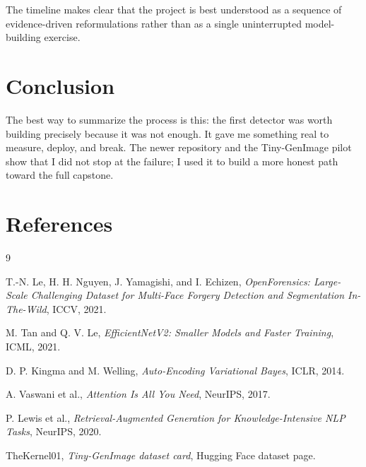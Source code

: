 \documentclass[11pt]{article}
\begin{document}
The timeline makes clear that the project is best understood as a sequence of evidence-driven reformulations rather than as a single uninterrupted model-building exercise.

\section{Conclusion}

The best way to summarize the process is this: the first detector was worth building precisely because it was not enough. It gave me something real to measure, deploy, and break. The newer repository and the Tiny-GenImage pilot show that I did not stop at the failure; I used it to build a more honest path toward the full capstone.


\section*{References}

\begin{thebibliography}{9}

T.-N. Le, H. H. Nguyen, J. Yamagishi, and I. Echizen,
\emph{OpenForensics: Large-Scale Challenging Dataset for Multi-Face Forgery Detection and Segmentation In-The-Wild},
ICCV, 2021.

M. Tan and Q. V. Le,
\emph{EfficientNetV2: Smaller Models and Faster Training},
ICML, 2021.

D. P. Kingma and M. Welling,
\emph{Auto-Encoding Variational Bayes},
ICLR, 2014.

A. Vaswani et al.,
\emph{Attention Is All You Need},
NeurIPS, 2017.

P. Lewis et al.,
\emph{Retrieval-Augmented Generation for Knowledge-Intensive NLP Tasks},
NeurIPS, 2020.

TheKernel01,
\emph{Tiny-GenImage dataset card},
Hugging Face dataset page.

\end{thebibliography}
\end{document}
